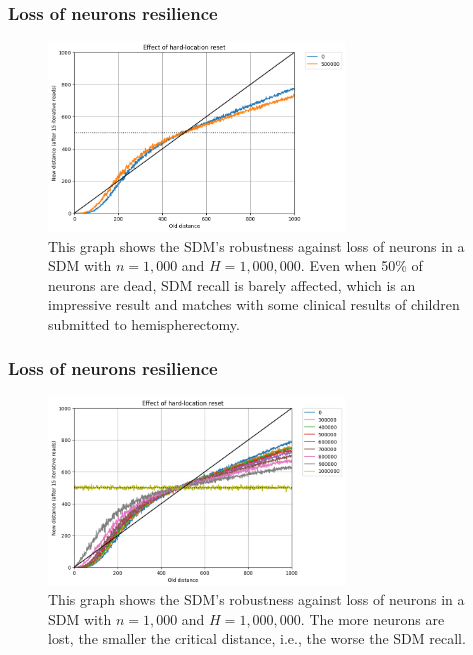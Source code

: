 \documentclass{beamer}
\begin{document}
\begin{frame}
\frametitle{Loss of neurons resilience}
\begin{figure}
\centering\includegraphics[width=0.7\textwidth]{./images02/new-images/sdm-neuron-death-500k.png}
\caption{This graph shows the SDM's robustness against loss of neurons in a SDM with $n=1,000$ and $H=1,000,000$. Even when 50\% of neurons are dead, SDM recall is barely affected, which is an impressive result and matches with some clinical results of children submitted to hemispherectomy.
\label{fig:sdm-neuron-death-500k}}
\end{figure}
\end{frame}


\begin{frame}
\frametitle{Loss of neurons resilience}
\begin{figure}
\centering\includegraphics[width=0.7\textwidth]{./images02/new-images/sdm-neuron-death-1m.png}
\caption{This graph shows the SDM's robustness against loss of neurons in a SDM with $n=1,000$ and $H=1,000,000$. The more neurons are lost, the smaller the critical distance, i.e., the worse the SDM recall.
\label{fig:sdm-neuron-death-1m}}
\end{figure}
\end{frame}
\end{document}
